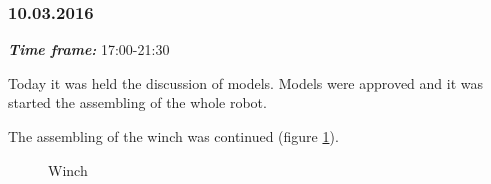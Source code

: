 \subsubsection{10.03.2016}
\textit{\textbf{Time frame:}} 17:00-21:30 

Today it was held the discussion of models. Models were approved and it was started the assembling of the whole robot.

The assembling of the winch was continued (figure \ref{Winch4.3}).

\begin{figure}[H]
	\begin{minipage}[h]{1\linewidth}
		\caption{Winch}
		\label{Winch4.3}
	\end{minipage}
\end{figure}
